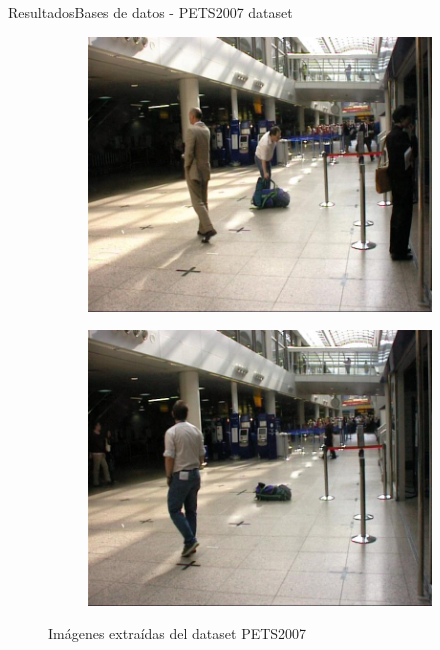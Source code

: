 \begin{frame}{Resultados}{Bases de datos - PETS2007 dataset}
\begin{figure}[ht]
  \centering
  \begin{subfigure}[b]{0.28\textwidth}
    \includegraphics[width=\textwidth]{Images/resultados/datasets/pets2007_1.jpg}
    \caption{}
    \label{fig:pets2007_1}
  \end{subfigure}
  \qquad
  \begin{subfigure}[b]{0.28\textwidth}
    \includegraphics[width=\textwidth]{Images/resultados/datasets/pets2007_2.jpg}
    \caption{}
    \label{fig:pets2007_2}
  \end{subfigure}
  \caption{Imágenes extraídas del dataset PETS2007}
  \label{fig:pets2007}
\end{figure}

\end{frame}

